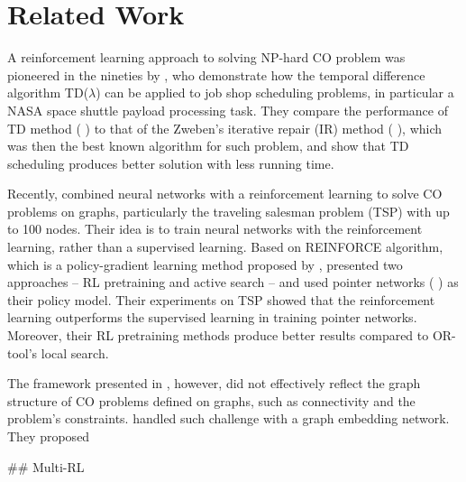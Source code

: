 \chapter{Related Work}
\label{chap:related_work}
\vspace{1cm}

A reinforcement learning approach to solving NP-hard CO problem was pioneered in the nineties by \citeauthor{zhang1995reinforcement} \cite{zhang1995reinforcement}, who demonstrate how the temporal difference algorithm TD($\lambda$) can be applied to job shop scheduling problems, in particular a NASA space shuttle payload processing task. They compare the performance of TD method (\citeauthor{sutton1988learning} \cite{sutton1988learning}) to that of the Zweben's iterative repair (IR) method (\citeauthor{zweben1993scheduling} \cite{zweben1993scheduling}), which was then the best known algorithm for such problem, and show that TD scheduling produces better solution with less running time.

Recently, \citeauthor{bello2016neural} \cite{bello2016neural} combined neural networks with a reinforcement learning to solve CO problems on graphs, particularly the traveling salesman problem (TSP) with up to 100 nodes. Their idea is to train neural networks with the reinforcement learning, rather than a supervised learning. Based on REINFORCE algorithm, which is a policy-gradient learning method proposed by \citeauthor{williams1992simple} \cite{williams1992simple}, \citeauthor{bello2016neural} presented two approaches -- RL pretraining and active search -- and used pointer networks (\citeauthor{vinyals2015pointer} \cite{vinyals2015pointer}) as their policy model. Their experiments on TSP showed that the reinforcement learning outperforms the supervised learning in training pointer networks. Moreover, their RL pretraining methods produce better results compared to OR-tool's local search.

The framework presented in \citeauthor{bello2016neural} \cite{bello2016neural}, however, did not effectively reflect the graph structure of CO problems defined on graphs, such as connectivity and the problem's constraints. \citeauthor{khalil2017learning} \cite{khalil2017learning} handled such challenge with a graph embedding network. They proposed

\citeauthor{kool2018attention} \cite{kool2018attention}

\citeauthor{li2018combinatorial} \cite{li2018combinatorial}

\citeauthor{ma2019combinatorial}\cite{ma2019combinatorial}

\citeauthor{barrett2019exploratory} \cite{barrett2019exploratory}

\citeauthor{li2019learning} \cite{li2019learning}

\citeauthor{nazari2018reinforcement} \cite{nazari2018reinforcement}


$\#\#$ Multi-RL
